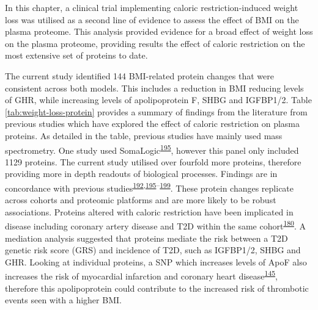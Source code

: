 \documentclass[11pt,twoside]{bristolthesis}
\begin{document}
In this chapter, a clinical trial implementing caloric restriction-induced weight loss was utilised as a second line of evidence to assess the effect of BMI on the plasma proteome. This analysis provided evidence for a broad effect of weight loss on the plasma proteome, providing results the effect of caloric restriction on the most extensive set of proteins to date.

The current study identified 144 BMI-related protein changes that were consistent across both models. This includes a reduction in BMI reducing levels of GHR, while increasing levels of apolipoprotein F, SHBG and IGFBP1/2. Table \ref{tab:weight-loss-protein} provides a summary of findings from the literature from previous studies which have explored the effect of caloric restriction on plasma proteins. As detailed in the table, previous studies have mainly used mass spectrometry. One study used SomaLogic\textsuperscript{\protect\hyperlink{ref-Carayol2017}{195}}, however this panel only included 1129 proteins. The current study utilised over fourfold more proteins, therefore providing more in depth readouts of biological processes. Findings are in concordance with previous studies\textsuperscript{\protect\hyperlink{ref-Figarska2020}{192},\protect\hyperlink{ref-Carayol2017}{195}--\protect\hyperlink{ref-Bruderer2019}{199}}. These protein changes replicate across cohorts and proteomic platforms and are more likely to be robust associations. Proteins altered with caloric restriction have been implicated in disease including coronary artery disease and T2D within the same cohort\textsuperscript{\protect\hyperlink{ref-Ritchie2019}{180}}. A mediation analysis suggested that proteins mediate the risk between a T2D genetic risk score (GRS) and incidence of T2D, such as IGFBP1/2, SHBG and GHR. Looking at individual proteins, a SNP which increases levels of ApoF also increases the risk of myocardial infarction and coronary heart disease\textsuperscript{\protect\hyperlink{ref-Liu2021}{145}}, therefore this apolipoprotein could contribute to the increased risk of thrombotic events seen with a higher BMI.
\end{document}
